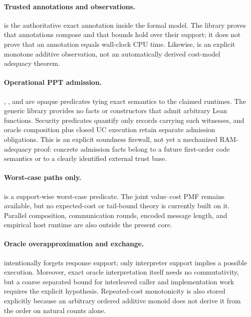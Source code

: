 \paragraph{Trusted annotations and observations.}
 is the authoritative exact annotation inside the
formal model.  The library proves that annotations compose and that bounds hold
over their support; it does not prove that an annotation equals wall-clock CPU
time.  Likewise,  is an explicit monotone additive observation,
not an automatically derived cost-model adequacy theorem.

\paragraph{Operational PPT admission.}
, , and
 are opaque predicates tying exact semantics to
the claimed runtimes.  The generic library provides no facts or constructors
that admit arbitrary Lean functions.  Security predicates quantify only
records carrying such witnesses, and oracle composition plus closed UC
execution retain separate admission obligations.  This is an explicit
soundness firewall, not yet a mechanized RAM-adequacy proof: concrete
admission facts belong to a future first-order code semantics or to a clearly
identified external trust base.

\paragraph{Worst-case paths only.}
 is a support-wise worst-case predicate.  The joint
value--cost PMF remains available, but no expected-cost or tail-bound theory is
currently built on it.  Parallel composition, communication rounds, encoded
message length, and empirical host runtime are also outside the present core.

\paragraph{Oracle overapproximation and exchange.}
 intentionally forgets response support; only
interpreter support implies a possible execution.  Moreover, exact oracle
interpretation itself needs no commutativity, but a coarse separated bound for
interleaved caller and implementation work requires the explicit
 hypothesis.  Repeated-cost monotonicity is also stored
explicitly because an arbitrary ordered additive monoid does not derive it from
the order on natural counts alone.

